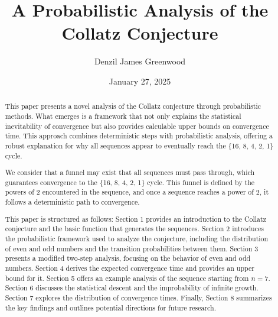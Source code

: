 \documentclass[12pt]{extarticle} %
\title{A Probabilistic Analysis of the Collatz Conjecture}
\author{Denzil James Greenwood}
\date{January 27, 2025}
\begin{document}
\maketitle

\begin{abstract}
This paper presents a novel analysis of the Collatz conjecture through probabilistic methods. What emerges is a framework that not only explains the statistical inevitability of convergence but also provides calculable upper bounds on convergence time. This approach combines deterministic steps with probabilistic analysis, offering a robust explanation for why all sequences appear to eventually reach the \{16, 8, 4, 2, 1\} cycle.

We consider that a funnel may exist that all sequences must pass through, which guarantees convergence to the \{16, 8, 4, 2, 1\} cycle. This funnel is defined by the powers of 2 encountered in the sequence, and once a sequence reaches a power of 2, it follows a deterministic path to convergence.

This paper is structured as follows: Section 1 provides an introduction to the Collatz conjecture and the basic function that generates the sequences. Section 2 introduces the probabilistic framework used to analyze the conjecture, including the distribution of even and odd numbers and the transition probabilities between them. Section 3 presents a modified two-step analysis, focusing on the behavior of even and odd numbers. Section 4 derives the expected convergence time and provides an upper bound for it. Section 5 offers an example analysis of the sequence starting from \( n = 7 \). Section 6 discusses the statistical descent and the improbability of infinite growth. Section 7 explores the distribution of convergence times. Finally, Section 8 summarizes the key findings and outlines potential directions for future research.
\end{abstract}








\end{document}
